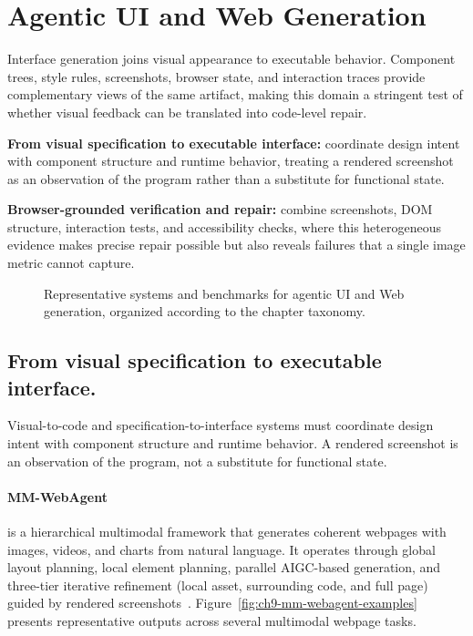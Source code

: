 \section{Agentic UI and Web Generation}
\label{sec:ui-web}

Interface generation joins visual appearance to executable behavior. Component trees, style rules, screenshots, browser state, and interaction traces provide complementary views of the same artifact, making this domain a stringent test of whether visual feedback can be translated into code-level repair.

\begin{keytakeaway}
\begin{keypoints}
  \item \textbf{From visual specification to executable interface:} coordinate design intent with component structure and runtime behavior, treating a rendered screenshot as an observation of the program rather than a substitute for functional state.

  \item \textbf{Browser-grounded verification and repair:} combine screenshots, DOM structure, interaction tests, and accessibility checks, where this heterogeneous evidence makes precise repair possible but also reveals failures that a single image metric cannot capture.
\end{keypoints}
\end{keytakeaway}

\begin{figure}[!htbp]
  \centering
  
  \caption{Representative systems and benchmarks for agentic UI and Web generation, organized according to the chapter taxonomy.}
  \label{fig:ch9-representative-systems}
\end{figure}

\subsection{From visual specification to executable interface.}
Visual-to-code and specification-to-interface systems must coordinate design intent with component structure and runtime behavior. A rendered screenshot is an observation of the program, not a substitute for functional state.

\paragraph{MM-WebAgent}
 is a hierarchical multimodal framework that generates coherent webpages with images, videos, and charts from natural language. It operates through global layout planning, local element planning, parallel AIGC-based generation, and three-tier iterative refinement (local asset, surrounding code, and full page) guided by rendered screenshots~\cite{avg260415309}. Figure~\ref{fig:ch9-mm-webagent-examples} presents representative outputs across several multimodal webpage tasks.

